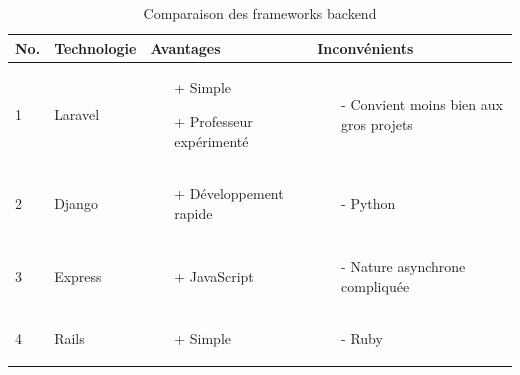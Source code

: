 \documentclass[
    iai, %
    eai, %
]{heig-tb}
\begin{document}
\begin{table}[h]
  \begin{center}
    \caption{Comparaison des frameworks backend \label{specification}}
    \begin{tabularx}{\textwidth}{|m{1cm} |m{2cm} |m{4cm} |m{4cm}|}
      No. & Technologie & Avantages                  & Inconvénients \\ \toprule
      1   & Laravel     & \begin{itemize}
        \item[+] Simple
        \item[+] Professeur expérimenté
      \end{itemize} & 
      \begin{itemize}
        \item[-] Convient moins bien aux gros projets
      \end{itemize}                                     \\ \midrule
      2   & Django      & \begin{itemize}
        \item[+] Développement rapide
      \end{itemize} & 
      \begin{itemize}
        \item[-] Python
      \end{itemize}                                     \\ \midrule
      3   & Express     & \begin{itemize}
        \item[+] JavaScript
      \end{itemize} & 
      \begin{itemize}
        \item[-] Nature asynchrone compliquée
      \end{itemize}                                     \\ \midrule
      4   & Rails       & \begin{itemize}
        \item[+] Simple
      \end{itemize} & 
      \begin{itemize}
        \item[-] Ruby
      \end{itemize}                                     \\ \midrule
    \end{tabularx}
  \end{center}
\end{table}
\end{document}

